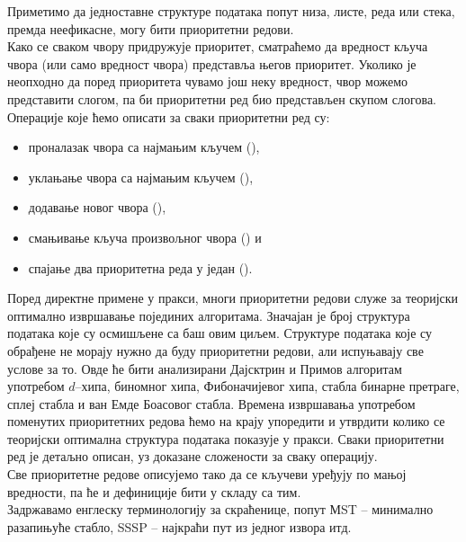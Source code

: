 \documentclass[11pt, a4paper]{article}
\theoremstyle{remark}
\numberwithin{equation}{section}
\begin{document}
	\noindent Приметимо да једноставне структуре података попут низа, листе, реда или стека, премда неефикасне, могу бити приоритетни редови. \\
	
	\noindent Како се сваком чвору придружује приоритет, сматраћемо да вредност кључа чвора (или само вредност чвора) представља његов приоритет. Уколико је неопходно да поред приоритета чувамо још неку вредност, чвор можемо представити слогом, па би приоритетни ред био представљен скупом слогова. \\
	
	\noindent Операције које ћемо описати за сваки приоритетни ред су:
	\begin{itemize}
		\item проналазак чвора са најмањим кључем (),
		\item уклањање чвора са најмањим кључем (),
		\item додавање новог чвора (),
		\item смањивање кључа произвољног чвора () и
		\item спајање два приоритетна реда у један (). \\
	\end{itemize}
	
	\noindent Поред директне примене у пракси, многи приоритетни редови служе за теоријски оптимално извршавање појединих алгоритама. Значајан је број структура података које су осмишљене са баш овим циљем. Структуре података које су обрађене не морају нужно да буду приоритетни редови, али испуњавају све услове за то. Овде ће бити анализирани Дајсктрин и Примов алгоритам употребом $d$--хипа, биномног хипа, Фибоначијевог хипа, стабла бинарне претраге, сплеј стабла и ван Емде Боасовог стабла. Времена извршавања употребом поменутих приоритетних редова ћемо на крају упоредити и утврдити колико се теоријски оптимална структура података показује у пракси. Сваки приоритетни ред је детаљно описан, уз доказане сложености за сваку операцију. \\
	
	\noindent Све приоритетне редове описујемо тако да се кључеви уређују по мањој вредности, па ће и дефиниције бити у складу са тим. \\
	
	\noindent Задржавамо енглеску терминологију за скраћенице, попут МST -- минимално разапињуће стабло, SSSP -- најкраћи пут из једног извора итд. \\
		
\end{document}
